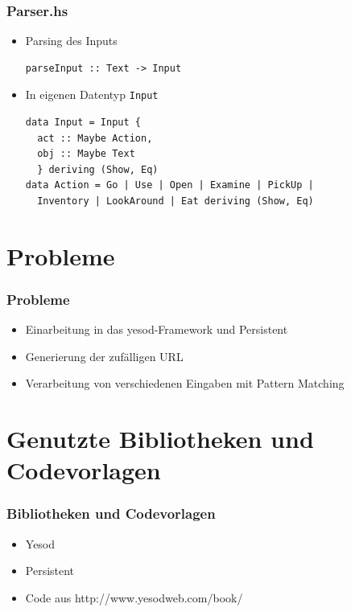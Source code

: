 \documentclass[hyperref={pdfpagelabels=false}]{beamer}
\begin{document}
\begin{frame}[fragile]
  \frametitle{Parser.hs}
  \begin{itemize}
    \item Parsing des Inputs
      \begin{lstlisting}
parseInput :: Text -> Input
      \end{lstlisting}
    \item In eigenen Datentyp \verb|Input|
    \begin{lstlisting}
data Input = Input {
  act :: Maybe Action,
  obj :: Maybe Text
  } deriving (Show, Eq)
data Action = Go | Use | Open | Examine | PickUp |
  Inventory | LookAround | Eat deriving (Show, Eq)
    \end{lstlisting}
  \end{itemize}
\end{frame}
\section{Probleme}
\begin{frame}
  \frametitle{Probleme}
  \begin{itemize}
    \item Einarbeitung in das yesod-Framework und Persistent
    \item Generierung der zufälligen URL
    \item Verarbeitung von verschiedenen Eingaben mit Pattern Matching
  \end{itemize}
\end{frame}
\section{Genutzte Bibliotheken und Codevorlagen}
\begin{frame}
  \frametitle{Bibliotheken und Codevorlagen}
  \begin{itemize}
    \item Yesod
    \item Persistent
    \item Code aus http://www.yesodweb.com/book/
  \end{itemize}
\end{frame}
\end{document}
